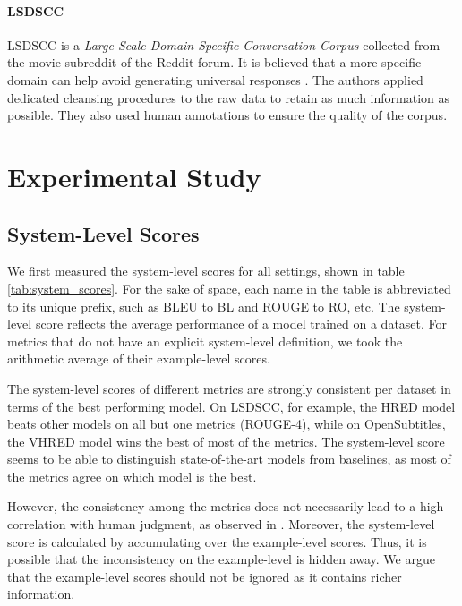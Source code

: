 \documentclass[runningheads]{llncs}
\begin{document}
    \paragraph{LSDSCC}
    LSDSCC \cite{LSDSCC} is a \emph{Large Scale Domain-Specific Conversation Corpus} collected from the movie subreddit of the Reddit forum. It is believed that a more specific domain can help avoid generating universal responses \cite{LSDSCC}. The authors applied dedicated cleansing procedures to the raw data to retain as much information as possible. They also used human annotations to ensure the quality of the corpus.

    \section{Experimental Study}
    \subsection{System-Level Scores}
    We first measured the system-level scores for all settings, shown in table \ref{tab:system_scores}. For the sake of space, each name in the table is abbreviated to its unique prefix, such as BLEU to BL and ROUGE to RO, etc. The system-level score reflects the average performance of a model trained on a dataset. For metrics that do not have an explicit system-level definition, we took the arithmetic average of their example-level scores.
    

    The system-level scores of different metrics are strongly consistent per dataset in terms of the best performing model. On LSDSCC, for example, the HRED model beats other models on all but one metrics (ROUGE-4), while on OpenSubtitles, the VHRED model wins the best of most of the metrics. The system-level score seems to be able to distinguish state-of-the-art models from baselines, as most of the metrics agree on which model is the best.

    However, the consistency among the metrics does not necessarily lead to a high correlation with human judgment, as observed in \cite{HowNot}. Moreover, the system-level score is calculated by accumulating over the example-level scores. Thus, it is possible that the inconsistency on the example-level is hidden away. We argue that the example-level scores should not be ignored as it contains richer information.
\end{document}
